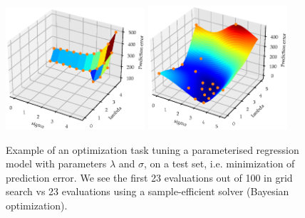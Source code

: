 \begin{figure}[H]%
    \centering
    {\includegraphics[width=0.46\textwidth]{Pictures/BO_vs_Grid2.eps} }%
    \qquad
   {\includegraphics[width=0.46\textwidth]{Pictures/BO_vs_Grid1.eps} }%
    \caption{Example of an optimization task tuning a parameterised regression model with parameters
    $\lambda$ and $\sigma$, on a test set, i.e. minimization of prediction error. We see the first
    23 evaluations out of 100 in grid search vs 23 evaluations using a sample-efficient solver (Bayesian
    optimization).}%
    \label{Sample_efficient_illustration}%
\end{figure}

